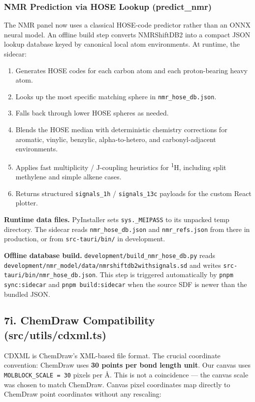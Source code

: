 \documentclass[11pt,a4paper]{article}
\begin{document}
\subsubsection{NMR Prediction via HOSE Lookup (predict\_nmr)}

The NMR panel now uses a classical HOSE-code predictor rather than an ONNX neural model.
An offline build step converts NMRShiftDB2 into a compact JSON lookup database keyed by
canonical local atom environments. At runtime, the sidecar:

\begin{enumerate}[leftmargin=1.5em]
  \item Generates HOSE codes for each carbon atom and each proton-bearing heavy atom.
  \item Looks up the most specific matching sphere in \lstinline|nmr_hose_db.json|.
  \item Falls back through lower HOSE spheres as needed.
  \item Blends the HOSE median with deterministic chemistry corrections for aromatic,
        vinylic, benzylic, alpha-to-hetero, and carbonyl-adjacent environments.
  \item Applies fast multiplicity / J-coupling heuristics for \textsuperscript{1}H,
        including split methylene and simple alkene cases.
  \item Returns structured \lstinline|signals_1h| / \lstinline|signals_13c| payloads for
        the custom React plotter.
\end{enumerate}

\textbf{Runtime data files.}
PyInstaller sets \lstinline|sys._MEIPASS| to its unpacked temp directory.
The sidecar reads \lstinline|nmr_hose_db.json| and \lstinline|nmr_refs.json| from there in
production, or from \lstinline|src-tauri/bin/| in development.

\textbf{Offline database build.}
\lstinline|development/build_nmr_hose_db.py| reads
\lstinline|development/nmr_model/data/nmrshiftdb2withsignals.sd| and writes
\lstinline|src-tauri/bin/nmr_hose_db.json|. This step is triggered automatically by
\lstinline|pnpm sync:sidecar| and \lstinline|pnpm build:sidecar| when the source SDF is newer
than the bundled JSON.

\subsection{7i. ChemDraw Compatibility (src/utils/cdxml.ts)}

CDXML is ChemDraw's XML-based file format. The crucial coordinate convention:
ChemDraw uses \textbf{30 points per bond length unit}. Our canvas uses
\lstinline|MOLBLOCK_SCALE = 30| pixels per \AA. This is not a coincidence --- the
canvas scale was chosen to match ChemDraw. Canvas pixel coordinates map directly to
ChemDraw point coordinates without any rescaling:
\end{document}
